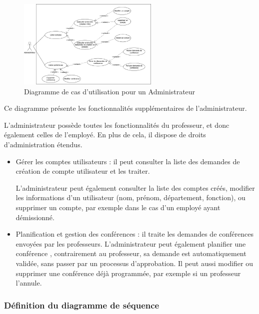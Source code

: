 \documentclass{article}
\begin{document}
\begin{figure}[H]
  \centering
  \includegraphics[width=0.6\textwidth]{admin(1.1).drawio.png}
  \caption{Diagramme de cas d'utilisation pour un Administrateur}
  \label{fig:adminusecase}
\end{figure}
\noindent Ce diagramme présente les fonctionnalités supplémentaires de l'administrateur.

\noindent L’administrateur possède toutes les fonctionnalités du professeur, et donc également celles de l’employé. En plus de cela, il dispose de droits d’administration étendus.
\begin{itemize}
    \item Gérer les comptes utilisateurs : il peut consulter la liste des demandes de création de compte utilisateur et les traiter. 

    

L’administrateur peut également consulter la liste des comptes créés, modifier les informations d’un utilisateur (nom, prénom, département, fonction), ou supprimer un compte, par exemple dans le cas d’un employé ayant démissionné.

\item Planification et gestion des conférences : il traite les demandes de conférences envoyées par les professeurs. L’administrateur peut également planifier une conférence , contrairement au professeur, sa demande est automatiquement validée, sans passer par un processus d’approbation. Il peut aussi modifier ou supprimer une conférence déjà programmée, par exemple si un professeur l’annule.




 


    
\end{itemize}

\subsubsection{Définition du diagramme de séquence}
\end{document}
